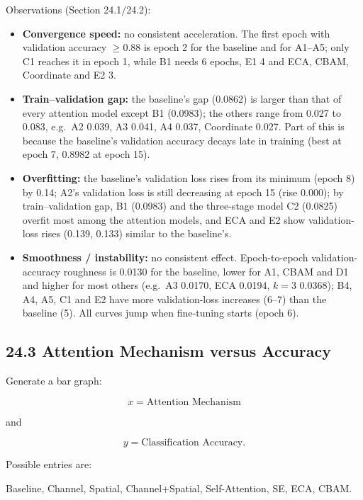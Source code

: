 \documentclass[10pt]{article}
\begin{document}
Observations (Section 24.1/24.2):
\begin{itemize}
\item \textbf{Convergence speed:} no consistent acceleration. The first epoch with validation accuracy $\ge0.88$ is epoch 2 for the baseline and for A1--A5; only C1 reaches it in epoch 1, while B1 needs 6 epochs, E1 4 and ECA, CBAM, Coordinate and E2 3.
\item \textbf{Train--validation gap:} the baseline's gap (0.0862) is larger than that of every attention model except B1 (0.0983); the others range from 0.027 to 0.083, e.g.\ A2 0.039, A3 0.041, A4 0.037, Coordinate 0.027. Part of this is because the baseline's validation accuracy decays late in training (best at epoch 7, 0.8982 at epoch 15).
\item \textbf{Overfitting:} the baseline's validation loss rises from its minimum (epoch 8) by 0.14; A2's validation loss is still decreasing at epoch 15 (rise 0.000); by train--validation gap, B1 (0.0983) and the three-stage model C2 (0.0825) overfit most among the attention models, and ECA and E2 show validation-loss rises (0.139, 0.133) similar to the baseline's.
\item \textbf{Smoothness / instability:} no consistent effect. Epoch-to-epoch validation-accuracy roughness is 0.0130 for the baseline, lower for A1, CBAM and D1 and higher for most others (e.g.\ A3 0.0170, ECA 0.0194, $k{=}3$ 0.0368); B4, A4, A5, C1 and E2 have more validation-loss increases (6--7) than the baseline (5). All curves jump when fine-tuning starts (epoch 6).
\end{itemize}


\subsection*{24.3 Attention Mechanism versus Accuracy}

Generate a bar graph:

\[
x=
\text{Attention Mechanism}
\]

and

\[
y=
\text{Classification Accuracy}.
\]

Possible entries are:

\begin{center}

Baseline,
Channel,
Spatial,
Channel+Spatial,
Self-Attention,
SE,
ECA,
CBAM.

\end{center}
\end{document}
